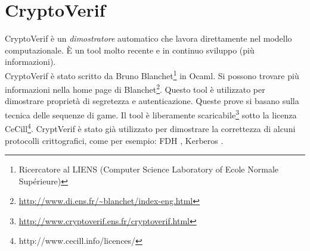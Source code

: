 \documentclass[a4paper,openright,twoside,12pt]{report}
\begin{document}
\chapter{CryptoVerif}
CryptoVerif \`e un \emph{dimostratore} automatico che lavora direttamente nel modello computazionale. \`E un tool molto recente e in continuo sviluppo (pi\`u informazioni).\\
CryptoVerif \`e stato scritto da Bruno Blanchet\footnote{Ricercatore al LIENS (Computer Science Laboratory of Ecole Normale Supérieure)} in Ocaml. 
Si possono trovare pi\`u informazioni nella home page di Blanchet\footnote{\url{http://www.di.ens.fr/~blanchet/index-eng.html}}.
Questo tool \`e utilizzato per dimostrare propriet\`a di segretezza e autenticazione. Queste prove si basano sulla tecnica delle sequenze di game.
Il tool \`e liberamente scaricabile\footnote{\url{http://www.cryptoverif.ens.fr/cryptoverif.html}} sotto la licenza CeCill\footnote{http://www.cecill.info/licences/}.
CryptVerif \`e stato gi\`a utilizzato per dimostrare la correttezza di alcuni protocolli crittografici, come per esempio: FDH \cite{BlanchetPointchevalCrypto06}, 
Kerberos \cite{BlanchetJaggardScedrovTsayAsiaCCS08}.
\newpage
\end{document}
